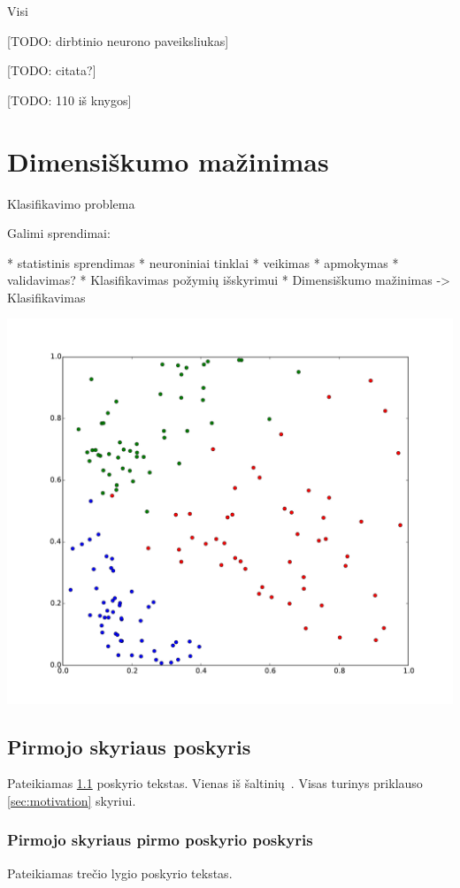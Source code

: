\documentclass[a4paper,12pt,fleqn]{article}
\begin{document}
Visi



[TODO: dirbtinio neurono paveiksliukas]


[TODO: citata?]


[TODO: 110 iš knygos]


\section{Dimensiškumo mažinimas}


Klasifikavimo problema

Galimi sprendimai:

	* statistinis sprendimas
	* neuroniniai tinklai
		* veikimas
		* apmokymas
		* validavimas?
		* Klasifikavimas požymių išskyrimui
		* Dimensiškumo mažinimas -> Klasifikavimas



\includegraphics[width=\linewidth]{pics/classification}

\subsection{Pirmojo skyriaus poskyris}
\label{sec:example}
Pateikiamas \ref{sec:example} poskyrio tekstas. Vienas iš šaltinių~\cite{KTZ}. Visas turinys priklauso \ref{sec:motivation} skyriui.

\subsubsection{Pirmojo skyriaus pirmo poskyrio poskyris}
\label{sec:data}
Pateikiamas trečio lygio poskyrio tekstas.
\end{document}
